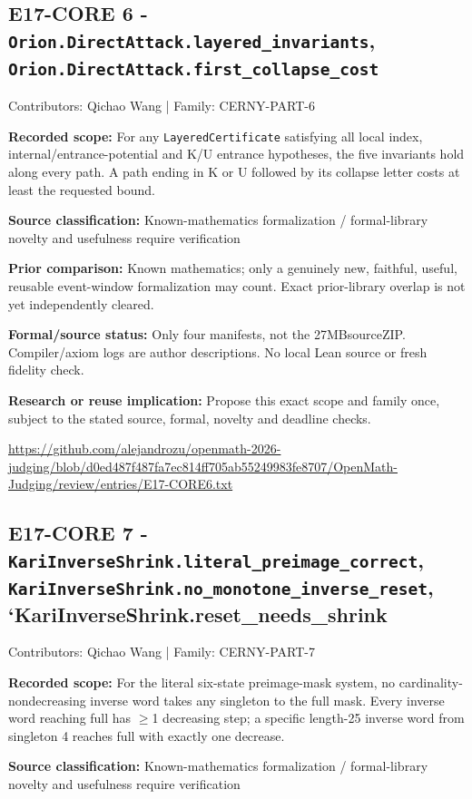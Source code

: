 \documentclass[11pt,a4paper]{article}
\begin{document}
\begin{samepage}
\subsection{E17-CORE 6  -  \texttt{Orion.DirectAttack.layered\_invariants}, \texttt{Orion.DirectAttack.first\_collapse\_cost}}
{\small Contributors: Qichao Wang | Family: CERNY-PART-6\par}

\textbf{Recorded scope:} For any \texttt{LayeredCertificate} satisfying all local index, internal/entrance-potential and K/U entrance hypotheses, the five invariants hold along every path. A path ending in K or U followed by its collapse letter costs at least the requested bound.

\end{samepage}
\textbf{Source classification:} Known-mathematics formalization / formal-library novelty and usefulness require verification

\textbf{Prior comparison:} Known mathematics; only a genuinely new, faithful, useful, reusable event-window formalization may count. Exact prior-library overlap is not yet independently cleared.

\textbf{Formal/source status:} Only four manifests, not the 27MBsourceZIP. Compiler/axiom logs are author descriptions. No local Lean source or fresh fidelity check.

\textbf{Research or reuse implication:} Propose this exact scope and family once, subject to the stated source, formal, novelty and deadline checks.

{\small \url{https://github.com/alejandrozu/openmath-2026-judging/blob/d0ed487f487fa7ec814ff705ab55249983fe8707/OpenMath-Judging/review/entries/E17-CORE6.txt}\par}

\begin{samepage}
\subsection{E17-CORE 7  -  \texttt{KariInverseShrink.literal\_preimage\_correct}, \texttt{KariInverseShrink.no\_monotone\_inverse\_reset}, `KariInverseShrink.reset\_needs\_shrink}
{\small Contributors: Qichao Wang | Family: CERNY-PART-7\par}

\textbf{Recorded scope:} For the literal six-state preimage-mask system, no cardinality-nondecreasing inverse word takes any singleton to the full mask. Every inverse word reaching full has \ensuremath{\geq}1 decreasing step; a specific length-25 inverse word from singleton 4 reaches full with exactly one decrease.

\end{samepage}
\textbf{Source classification:} Known-mathematics formalization / formal-library novelty and usefulness require verification
\end{document}
